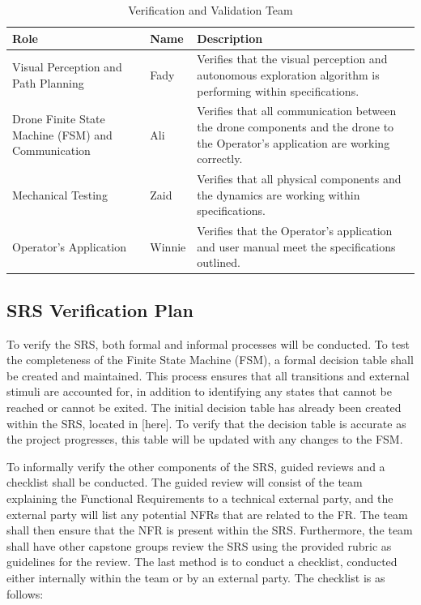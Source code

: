 \documentclass[12pt, titlepage]{article}
\begin{document}
\begin{table}[!h]
\begin{center}
\caption {Verification and Validation Team}
\label{VnV_Team}
\begin{tabular}{ | m{3cm} | m{3cm} | m{8cm} | }
\hline
Role & Name & Description \\
\hline
 Visual Perception and Path Planning & Fady & Verifies that the visual perception and autonomous exploration algorithm is performing within specifications. \\
\hline
Drone Finite State Machine (FSM) and Communication & Ali & Verifies that all communication between the drone components and the drone to the Operator's application are working correctly. \\
\hline
Mechanical Testing & Zaid & Verifies that all physical components and the dynamics are working within specifications. \\
\hline
Operator's Application & Winnie & Verifies that the Operator's application and user manual meet the specifications outlined.
\\
\hline
\end{tabular}
\end{center}
\end{table}

\clearpage

\subsection{SRS Verification Plan}

To verify the SRS, both formal and informal processes will be conducted. To test the completeness of the Finite State Machine (FSM), a formal decision table shall be created and maintained. This process ensures that all transitions and external stimuli are accounted for, in addition to identifying any states that cannot be reached or cannot be exited. The initial decision table has already been created within the SRS, located in [here]. To verify that the decision table is accurate as the project progresses, this table will be updated with any changes to the FSM. 

To informally verify the other components of the SRS, guided reviews and a checklist shall be conducted. The guided review will consist of the team explaining the Functional Requirements to a technical external party, and the external party will list any potential NFRs that are related to the FR. The team shall then ensure that the NFR is present within the SRS. Furthermore, the team shall have other capstone groups review the SRS using the provided rubric as guidelines for the review. The last method is to conduct a checklist, conducted either internally within the team or by an external party. The checklist is as follows: 
\end{document}
